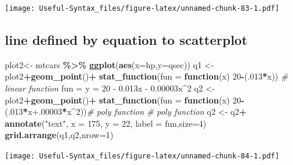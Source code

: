 \documentclass[
]{article}
\newenvironment{Shaded}{\begin{snugshade}}{\end{snugshade}}
\newcommand{\AttributeTok}[1]{\textcolor[rgb]{0.13,0.29,0.53}{#1}}
\newcommand{\CommentTok}[1]{\textcolor[rgb]{0.56,0.35,0.01}{\textit{#1}}}
\newcommand{\ControlFlowTok}[1]{\textcolor[rgb]{0.13,0.29,0.53}{\textbf{#1}}}
\newcommand{\DecValTok}[1]{\textcolor[rgb]{0.00,0.00,0.81}{#1}}
\newcommand{\FloatTok}[1]{\textcolor[rgb]{0.00,0.00,0.81}{#1}}
\newcommand{\FunctionTok}[1]{\textcolor[rgb]{0.13,0.29,0.53}{\textbf{#1}}}
\newcommand{\NormalTok}[1]{#1}
\newcommand{\OtherTok}[1]{\textcolor[rgb]{0.56,0.35,0.01}{#1}}
\newcommand{\SpecialCharTok}[1]{\textcolor[rgb]{0.81,0.36,0.00}{\textbf{#1}}}
\newcommand{\StringTok}[1]{\textcolor[rgb]{0.31,0.60,0.02}{#1}}
\begin{document}
\texttt{[image: Useful-Syntax\_files/figure-latex/unnamed-chunk-83-1.pdf]}

\hypertarget{line-defined-by-equation-to-scatterplot}{%
\subsection{line defined by equation to scatterplot}\label{line-defined-by-equation-to-scatterplot}}

\begin{Shaded}
\begin{Highlighting}[]
\NormalTok{plot2}\OtherTok{\textless{}{-}}\NormalTok{ mtcars }\SpecialCharTok{\%\textgreater{}\%} \FunctionTok{ggplot}\NormalTok{(}\FunctionTok{aes}\NormalTok{(}\AttributeTok{x=}\NormalTok{hp,}\AttributeTok{y=}\NormalTok{qsec))}
\NormalTok{q1 }\OtherTok{\textless{}{-}}\NormalTok{ plot2}\SpecialCharTok{+}\FunctionTok{geom\_point}\NormalTok{()}\SpecialCharTok{+}
    \FunctionTok{stat\_function}\NormalTok{(}\AttributeTok{fun =} \ControlFlowTok{function}\NormalTok{(x) }\DecValTok{20}\SpecialCharTok{{-}}\NormalTok{(.}\DecValTok{013}\SpecialCharTok{*}\NormalTok{x)) }\CommentTok{\# linear function}
\NormalTok{fun }\OtherTok{=} \StringTok{\textquotesingle{}y = 20 {-} 0.013x {-} 0.00003x\^{}2\textquotesingle{}}
\NormalTok{q2 }\OtherTok{\textless{}{-}}\NormalTok{ plot2}\SpecialCharTok{+}\FunctionTok{geom\_point}\NormalTok{()}\SpecialCharTok{+}    \FunctionTok{stat\_function}\NormalTok{(}\AttributeTok{fun =} \ControlFlowTok{function}\NormalTok{(x) }\DecValTok{20}\SpecialCharTok{{-}}\NormalTok{(.}\DecValTok{013}\SpecialCharTok{*}\NormalTok{x}\FloatTok{+.00003}\SpecialCharTok{*}\NormalTok{x}\SpecialCharTok{\^{}}\DecValTok{2}\NormalTok{))}\CommentTok{\# poly function}
 \CommentTok{\# poly function}
\NormalTok{q2 }\OtherTok{\textless{}{-}}\NormalTok{ q2}\SpecialCharTok{+} \FunctionTok{annotate}\NormalTok{(}\StringTok{"text"}\NormalTok{, }\AttributeTok{x =} \DecValTok{175}\NormalTok{, }\AttributeTok{y =} \DecValTok{22}\NormalTok{, }\AttributeTok{label =}\NormalTok{ fun,}\AttributeTok{size=}\DecValTok{4}\NormalTok{)}
\FunctionTok{grid.arrange}\NormalTok{(q1,q2,}\AttributeTok{nrow=}\DecValTok{1}\NormalTok{)}
\end{Highlighting}
\end{Shaded}

\texttt{[image: Useful-Syntax\_files/figure-latex/unnamed-chunk-84-1.pdf]}
\end{document}
